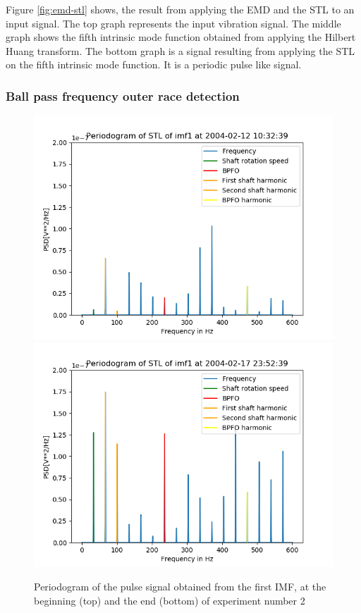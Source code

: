 \documentclass[../Main/thesis.tex]{subfiles}
\begin{document}
\justify
Figure \ref{fig:emd-stl} shows, the result from applying the EMD and the STL to an input signal. The top graph represents the input vibration signal. The middle graph shows the fifth intrinsic mode function obtained from applying the Hilbert Huang transform. The bottom graph is a signal resulting from applying the STL on the fifth intrinsic mode function. It is a periodic pulse like signal.

\subsubsection{Ball pass frequency outer race detection} 
 \begin{figure}[H]
 	\centering
 	\includegraphics[width=0.8\linewidth]{../fig/periodogram_bpfo/start_imf1_bpfo}
 	\includegraphics[width=0.8\linewidth]{../fig/periodogram_bpfo/end_imf1_bpfo}
 	\caption{Periodogram of the pulse signal obtained from the first IMF, at the beginning (top) and the end (bottom) of experiment number 2}
 	\label{fig:startimf1bpfo}
 \end{figure}
\end{document}
